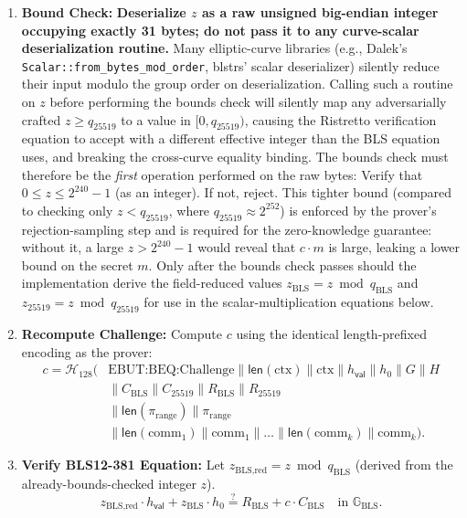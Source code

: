 \documentclass[11pt]{article}
\theoremstyle{definitionstyle}
\theoremstyle{plain}
\begin{document}
\begin{enumerate}[leftmargin=*]
\item \textbf{Bound Check:}
  \textbf{Deserialize $z$ as a raw unsigned big-endian integer occupying exactly 31 bytes; do not pass it to any curve-scalar deserialization routine.}  Many elliptic-curve libraries (e.g., Dalek's \texttt{Scalar::from\_bytes\_mod\_order}, blstrs' scalar deserializer) silently reduce their input modulo the group order on deserialization.  Calling such a routine on $z$ before performing the bounds check will silently map any adversarially crafted $z \ge q_{25519}$ to a value in $[0, q_{25519})$, causing the Ristretto verification equation to accept with a different effective integer than the BLS equation uses, and breaking the cross-curve equality binding.  The bounds check must therefore be the \emph{first} operation performed on the raw bytes:
  Verify that $0 \le z \le 2^{240}-1$ (as an integer). If not, reject. This tighter bound (compared to checking only $z < q_{25519}$, where $q_{25519} \approx 2^{252}$) is enforced by the prover's rejection-sampling step and is required for the zero-knowledge guarantee: without it, a large $z > 2^{240}-1$ would reveal that $c \cdot m$ is large, leaking a lower bound on the secret $m$.  Only after the bounds check passes should the implementation derive the field-reduced values $z_{\text{BLS}} = z \bmod q_{\text{BLS}}$ and $z_{25519} = z \bmod q_{25519}$ for use in the scalar-multiplication equations below.

\item \textbf{Recompute Challenge:}
  Compute $c$ using the identical length-prefixed encoding as the prover:
  \[
  \begin{aligned}
  c = \mathcal{H}_{128}\!\bigl(&\text{EBUT:BEQ:Challenge} \parallel \mathsf{len}(\text{ctx}) \parallel \text{ctx} \parallel h_{\mathsf{val}} \parallel h_0 \parallel G \parallel H \\
  &\parallel C_{\text{BLS}} \parallel C_{25519} \parallel R_{\text{BLS}} \parallel R_{25519} \\
  &\parallel \mathsf{len}(\pi_{\text{range}}) \parallel \pi_{\text{range}} \\
  &\parallel \mathsf{len}(\text{comm}_1) \parallel \text{comm}_1 \parallel \dots \parallel \mathsf{len}(\text{comm}_k) \parallel \text{comm}_k\bigr).
  \end{aligned}
  \]

\item \textbf{Verify BLS12-381 Equation:}
  Let $z_{\text{BLS,red}} = z \bmod q_{\text{BLS}}$ (derived from the already-bounds-checked integer $z$).
  \[
  z_{\text{BLS,red}} \cdot h_{\mathsf{val}} + z_{\text{BLS}} \cdot h_0 \stackrel{?}{=} R_{\text{BLS}} + c \cdot C_{\text{BLS}} \quad \text{in } \mathbb{G}_{\text{BLS}}.
  \]


\end{enumerate}
\end{document}
